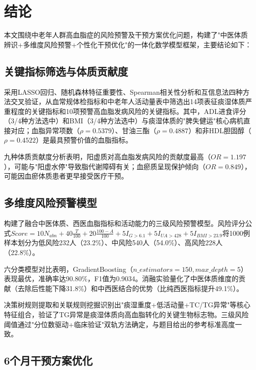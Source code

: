 \documentclass[12pt,a4paper]{ctexart}
\begin{document}
\newpage
\section{结论}

本文围绕中老年人群高血脂症的风险预警及干预方案优化问题，构建了"中医体质辨识+多维度风险预警+个性化干预优化"的一体化数学模型框架，主要结论如下：

\subsection{关键指标筛选与体质贡献度}

采用LASSO回归、随机森林特征重要性、Spearman相关性分析和互信息法四种方法交叉验证，从血常规体检指标和中老年人活动量表中筛选出14项表征痰湿体质严重程度的关键指标和10项预警高血脂发病风险的关键指标。其中，ADL进食评分（3/4种方法选中）和BMI（3/4种方法选中）与痰湿体质的"脾失健运"核心病机直接对应；血脂异常项数（$\rho=0.5379$）、甘油三酯（$\rho=0.4887$）和非HDL胆固醇（$\rho=0.4522$）是最具预警价值的血脂指标。

九种体质贡献度分析表明，阳虚质对高血脂发病风险的贡献度最高（$OR=1.197$），可能与"阳虚水停"导致脂代谢障碍有关；血瘀质呈现保护倾向（$OR=0.849$），可能因血瘀体质患者更早接受医疗干预。

\subsection{多维度风险预警模型}

构建了融合中医体质、西医血脂指标和活动能力的三级风险预警模型。风险评分公式$Score = 10N_{abn} + 40\frac{T}{100} + 20\frac{100-A}{100} + 5I_{G>6.1} + 5I_{UA>428} + 5I_{BMI>23.9}$将1000例样本划分为低风险232人（23.2\%）、中风险540人（54.0\%）、高风险228人（22.8\%）。

六分类模型对比表明，GradientBoosting（$n\_estimators=150, max\_depth=5$）表现最优，准确率达90.80\%，F1值为0.9034。消融实验量化了中医体质维度的贡献（去除后性能下降31.8\%）和中西医结合的优势（比纯西医指标提升49.1\%）。

决策树规则提取和关联规则挖掘识别出"痰湿重度+低活动量+TC/TG异常"等核心特征组合，验证了TG异常是痰湿体质向高血脂转化的关键生物标志物。三级风险阈值通过"分位数驱动+临床验证"双轨方法确定，与题目给出的参考标准高度一致。

\subsection{6个月干预方案优化}
\end{document}
